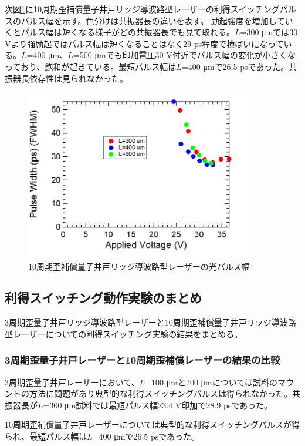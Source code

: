 {次図\ref{fig:fig_3_2_10QW_ridge_GS_FWHM}に10周期歪補償量子井戸リッジ導波路型レーザーの利得スイッチングパルスのパルス幅を示す。色分けは共振器長の違いを表す。
励起強度を増加していくとパルス幅は短くなる様子がどの共振器長でも見て取れる。$L$=300 \si{\micro\metre}では30 Vより強励起ではパルス幅は短くなることはなく29 ps程度で横ばいになっている。$L$=400 \si{\micro\metre}、$L$=500 \si{\micro\metre}でも印加電圧30 V付近でパルス幅の変化が小さくなっており、飽和が起きている。最短パルス幅は$L$=400 \si{\micro\metre}で26.5 psであった。共振器長依存性は見られなかった。
\begin{figure}[h]
	\centering
	\includegraphics[width=10cm]{figure/fig_3_2_10QW_ridge_GS_FWHM.png}
		\caption{10周期歪補償量子井戸リッジ導波路型レーザーの光パルス幅}
		\label{fig:fig_3_2_10QW_ridge_GS_FWHM}
\end{figure}

\subsection{利得スイッチング動作実験のまとめ}%

3周期歪量子井戸リッジ導波路型レーザーと10周期歪補償量子井戸リッジ導波路型レーザーについての利得スイッチング実験の結果をまとめる。


\subsubsection{3周期歪量子井戸レーザーと10周期歪補償レーザーの結果の比較}
3周期歪量子井戸レーザーにおいて、$L$=100 \si{\micro\metre}と200 \si{\micro\metre}については試料のマウントの方法に問題があり典型的な利得スイッチングパルスは得られなかった。共振器長が$L$=300 \si{\micro\metre}試料では最短パルス幅23.4 V印加で28.9 psであった。

10周期歪補償量子井戸レーザーについては典型的な利得スイッチングパルスが得られ、最短パルス幅は$L$=400 \si{\micro\metre}で26.5 psであった。

}
